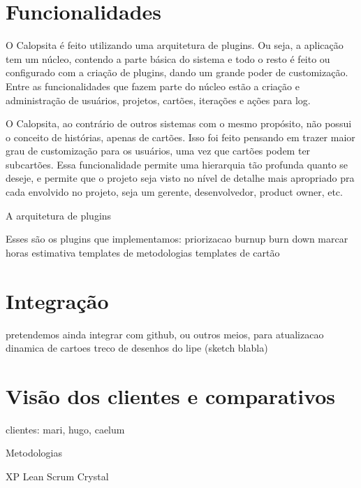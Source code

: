 \documentclass[titlepage,a4paper]{article}
\begin{document}
\section{Funcionalidades}

O Calopsita é feito utilizando uma arquitetura de plugins. Ou seja, a aplicação tem um núcleo, contendo a parte básica do sistema e todo o resto é feito ou configurado com a criação de plugins, dando um grande poder de customização.
Entre as funcionalidades que fazem parte do núcleo estão a criação e administração de usuários,
projetos, cartões, iterações e ações para log.

O Calopsita, ao contrário de outros sistemas com o mesmo propósito, não possui o conceito de histórias, apenas de cartões. Isso foi feito pensando em trazer maior grau de customização para os usuários, uma vez que cartões podem ter subcartões. Essa funcionalidade permite uma hierarquia tão profunda quanto se deseje, e permite que o projeto seja visto no nível de detalhe mais apropriado pra cada envolvido no projeto, seja um gerente, desenvolvedor, product owner, etc.

A arquitetura de plugins

Esses são os plugins que implementamos:
priorizacao
burnup
burn down
marcar horas
estimativa
templates de metodologias
templates de cartão

\section{Integração}
pretendemos ainda integrar com github, ou outros meios, para atualizacao dinamica de cartoes
treco de desenhos do lipe (sketch blabla)


\section{Visão dos clientes e comparativos}

clientes: mari, hugo, caelum

Metodologias

XP
Lean
Scrum
Crystal
\end{document}
